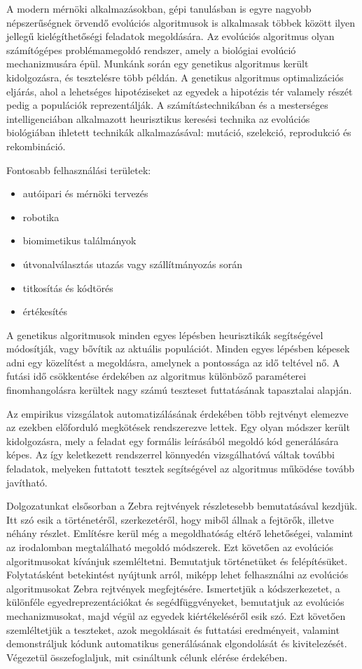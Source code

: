 \documentclass[12ppt,a4paper,oneside]{report}
\begin{document}
	{A modern mérnöki alkalmazásokban, gépi tanulásban is egyre nagyobb népszerűségnek örvendő evolúciós algoritmusok is alkalmasak többek között ilyen jellegű kielégíthetőségi feladatok megoldására. Az evolúciós algoritmus olyan számítógépes problémamegoldó rendszer, amely a biológiai evolúció mechanizmusára épül. Munkánk során egy genetikus algoritmus került kidolgozásra, és tesztelésre több példán. A genetikus algoritmus optimalizációs eljárás, ahol a lehetséges hipotéziseket az egyedek a hipotézis tér valamely részét pedig a populációk reprezentálják. A számítástechnikában és a mesterséges intelligenciában alkalmazott heurisztikus keresési technika az evolúciós biológiában ihletett technikák alkalmazásával: mutáció, szelekció, reprodukció és rekombináció.}

	{Fontosabb felhasználási területek:}

	\begin{itemize}
	\item autóipari és mérnöki tervezés
	\item robotika
	\item biomimetikus találmányok
	\item útvonalválasztás utazás vagy szállítmányozás során
	\item titkosítás és kódtörés
	\item értékesítés
	\end{itemize}

	{A genetikus algoritmusok minden egyes lépésben heurisztikák segítségével módosítják, vagy bővítik az aktuális populációt. Minden egyes lépésben képesek adni egy közelítést a megoldásra, amelynek a pontossága az idő teltével nő. A futási idő csökkentése érdekében az algoritmus különböző paraméterei finomhangolásra kerültek nagy számú teszteset futtatásának tapasztalai alapján.}

	{Az empirikus vizsgálatok automatizálásának érdekében több rejtvényt elemezve az ezekben előforduló megkötések rendszerezve lettek. Egy olyan módszer került kidolgozásra, mely a feladat egy formális leírásából megoldó kód generálására képes. Az így keletkezett rendszerrel könnyedén vizsgálhatóvá váltak további feladatok, melyeken futtatott tesztek segítségével az algoritmus működése tovább javítható.}

	{Dolgozatunkat elsősorban a Zebra rejtvények részletesebb bemutatásával kezdjük. Itt szó esik a történetéről, szerkezetéről, hogy miből állnak a fejtörők, illetve néhány részlet. Említésre kerül még a megoldhatóság eltérő lehetőségei, valamint az irodalomban megtalálható megoldó módszerek. Ezt követően az evolúciós algoritmusokat kívánjuk szemléltetni. Bemutatjuk történetüket és felépítésüket. Folytatásként betekintést nyújtunk arról, miképp lehet felhasználni az evolúciós algoritmusokat Zebra rejtvények megfejtésére. Ismertetjük a kódszerkezetet, a különféle egyedreprezentációkat és segédfüggvényeket, bemutatjuk az evolúciós mechanizmusokat, majd végül az egyedek kiértékeléséről esik szó. Ezt követően szemléltetjük a teszteket, azok megoldásait és futtatási eredményeit, valamint demonstráljuk kódunk automatikus generálásának elgondolását és kivitelezését. Végezetül összefoglaljuk, mit csináltunk célunk elérése érdekében.}
\end{document}
